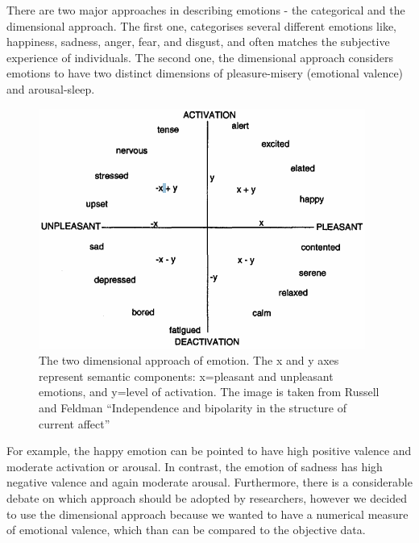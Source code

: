 \documentclass[a4paper]{report}
\begin{document}
		There are two major approaches in describing emotions - the categorical\cite{izard2007basic} and the dimensional approach\cite{feldman1998independence}. The first one, categorises several different emotions like, happiness, sadness, anger, fear, and disgust, and often matches the subjective experience of individuals. The second one, the dimensional approach considers emotions to have two distinct dimensions of pleasure-misery (emotional valence) and arousal-sleep.  
		\begin{figure}
			\centering
			\includegraphics[width=0.7\linewidth]{two-demensional-approach-emotions}
			\caption[Two dimensional approach of emotion]{The two dimensional approach of emotion. The x and y axes represent semantic components: x=pleasant and unpleasant emotions, and y=level of activation. The image is taken from Russell and Feldman ``Independence and bipolarity in the structure of current affect''\cite{feldman1998independence} }
			\label{fig:two-demensional-approach-emotions}
		\end{figure}
		For example, the happy emotion can be pointed to have high positive valence and moderate activation or arousal. In contrast, the emotion of sadness has high negative valence and again moderate arousal. Furthermore, there is a considerable debate on which approach should be adopted by researchers\cite{fox2008emotion}, however we decided to use the dimensional approach because we wanted to have a numerical measure of emotional valence, which than can be compared to the objective data.
		
\end{document}
